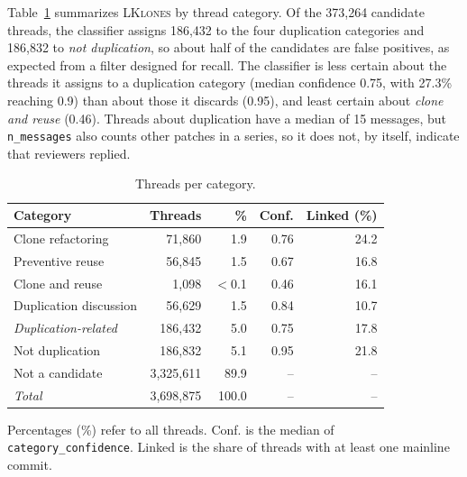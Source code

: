 \documentclass[10pt,conference]{IEEEtran}
\begin{document}
Table~\ref{tab:dataset-categories} summarizes \textsc{LKlones} by thread category. Of the 373,264 candidate threads, the classifier assigns 186,432 to the four duplication categories and 186,832 to \emph{not duplication}, so about half of the candidates are false positives, as expected from a filter designed for recall. The classifier is less certain about the threads it assigns to a duplication category (median confidence 0.75, with 27.3\% reaching 0.9) than about those it discards (0.95), and least certain about \emph{clone and reuse} (0.46). Threads about duplication have a median of 15 messages, but \texttt{n\_messages} also counts other patches in a series, so it does not, by itself, indicate that reviewers replied.

\begin{table}[ht]
  \centering
  \begin{threeparttable}
  \caption{Threads per category.}
  \label{tab:dataset-categories}
  \footnotesize
  \setlength{\tabcolsep}{4pt}
  \begin{tabularx}{\columnwidth}{ X r r r r }
    \toprule
    \textbf{Category} & \textbf{Threads} & \textbf{\%} & \textbf{Conf.} & \textbf{Linked (\%)} \\
    \midrule
    Clone refactoring & 71,860 & 1.9 & 0.76 & 24.2 \\
    Preventive reuse & 56,845 & 1.5 & 0.67 & 16.8 \\
    Clone and reuse & 1,098 & $<$0.1 & 0.46 & 16.1 \\
    Duplication discussion & 56,629 & 1.5 & 0.84 & 10.7 \\
    \midrule
    \textit{Duplication-related} & 186,432 & 5.0 & 0.75 & 17.8 \\
    Not duplication & 186,832 & 5.1 & 0.95 & 21.8 \\
    Not a candidate & 3,325,611 & 89.9 & -- & -- \\
    \midrule
    \textit{Total} & 3,698,875 & 100.0 & -- & -- \\
    \bottomrule
  \end{tabularx}
    \begin{tablenotes}[flushleft]
    \footnotesize
    \item[a] Percentages (\%) refer to all threads. Conf. is the median of \texttt{category\_confidence}. Linked is the share of threads with at least one mainline commit.
    \end{tablenotes}
  \end{threeparttable}
\end{table}
\end{document}
